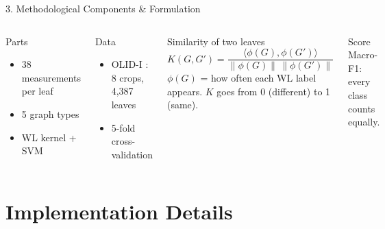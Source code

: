 \documentclass[aspectratio=169, 11pt]{beamer}
\begin{document}
\begin{frame}{3. Methodological Components \& Formulation}
    \begin{columns}[T]
        \begin{block}{Parts}
            \small
            \begin{itemize}
                \item 38 measurements per leaf
                \item 5 graph types
                \item WL kernel + SVM
            \end{itemize}
        \end{block}
        \begin{block}{Data}
            \small
            \begin{itemize}
                \item OLID-I \cite{orka2023olid}: 8 crops, 4,387 leaves
                \item 5-fold cross-validation \cite{kohavi1995study}
            \end{itemize}
        \end{block}

        \begin{block}{Similarity of two leaves}
            \[ K(G,G') = \frac{\langle \phi(G), \phi(G') \rangle}{\|\phi(G)\|\,\|\phi(G')\|} \]
            \scriptsize $\phi(G)$ = how often each WL label appears. $K$ goes from 0 (different) to 1 (same).
        \end{block}
        \begin{block}{Score}
            \small Macro-F1: every class counts equally.
        \end{block}
    \end{columns}
\end{frame}

\section{Implementation Details}
\end{document}
